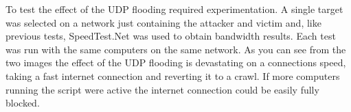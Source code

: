 To test the effect of the UDP flooding required experimentation. A single target was selected on a network just containing the attacker and victim and, like previous tests, SpeedTest.Net was used to obtain bandwidth results. Each test was run with the same computers on the same network. As you can see from the two images the effect of the UDP flooding is devastating on a connections speed, taking a fast internet connection and reverting it to a crawl. If more computers running the script were active the internet connection could be easily fully blocked.